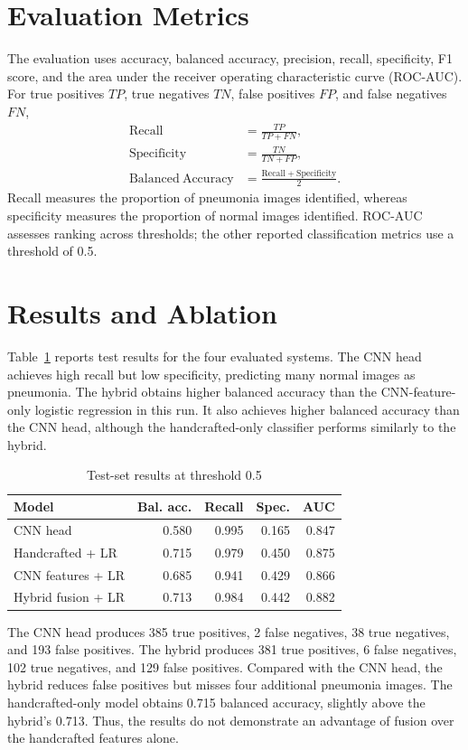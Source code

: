 \documentclass[conference]{IEEEtran}
\begin{document}
\section{Evaluation Metrics}
The evaluation uses accuracy, balanced accuracy, precision, recall, specificity, F1 score, and the area under the receiver operating characteristic curve (ROC-AUC). For true positives $TP$, true negatives $TN$, false positives $FP$, and false negatives $FN$,
\begin{align}
\mathrm{Recall} &= \frac{TP}{TP+FN}, \\
\mathrm{Specificity} &= \frac{TN}{TN+FP}, \\
\mathrm{Balanced\ Accuracy} &= \frac{\mathrm{Recall}+\mathrm{Specificity}}{2}.
\end{align}
Recall measures the proportion of pneumonia images identified, whereas specificity measures the proportion of normal images identified. ROC-AUC assesses ranking across thresholds; the other reported classification metrics use a threshold of 0.5.

\section{Results and Ablation}
Table~\ref{tab:results} reports test results for the four evaluated systems. The CNN head achieves high recall but low specificity, predicting many normal images as pneumonia. The hybrid obtains higher balanced accuracy than the CNN-feature-only logistic regression in this run. It also achieves higher balanced accuracy than the CNN head, although the handcrafted-only classifier performs similarly to the hybrid.

\begin{table}[ht]
\caption{Test-set results at threshold 0.5}
\label{tab:results}
\centering
\begin{tabular}{lrrrr}
\toprule
Model & Bal. acc. & Recall & Spec. & AUC \\
\midrule
CNN head & 0.580 & 0.995 & 0.165 & 0.847 \\
Handcrafted + LR & 0.715 & 0.979 & 0.450 & 0.875 \\
CNN features + LR & 0.685 & 0.941 & 0.429 & 0.866 \\
Hybrid fusion + LR & 0.713 & 0.984 & 0.442 & 0.882 \\
\bottomrule
\end{tabular}
\end{table}

The CNN head produces 385 true positives, 2 false negatives, 38 true negatives, and 193 false positives. The hybrid produces 381 true positives, 6 false negatives, 102 true negatives, and 129 false positives. Compared with the CNN head, the hybrid reduces false positives but misses four additional pneumonia images. The handcrafted-only model obtains 0.715 balanced accuracy, slightly above the hybrid's 0.713. Thus, the results do not demonstrate an advantage of fusion over the handcrafted features alone.
\end{document}

